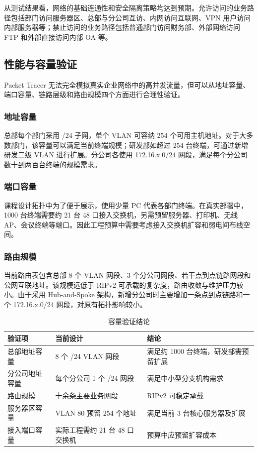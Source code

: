 \documentclass[12pt,a4paper]{ctexart}
\begin{document}
从测试结果看，网络的基础连通性和安全隔离策略均达到预期。允许访问的业务路径包括部门访问服务器区、总部与分公司互访、内网访问互联网、VPN 用户访问内部服务器等；禁止访问的业务路径包括普通部门访问财务部、外部网络访问 FTP 和外部直接访问内部 OA 等。

\subsection{性能与容量验证}

Packet Tracer 无法完全模拟真实企业网络中的高并发流量，但可以从地址容量、端口容量、链路层级和路由规模四个方面进行合理性验证。

\subsubsection{地址容量}

总部每个部门采用 /24 子网，单个 VLAN 可容纳 254 个可用主机地址。对于大多数部门，该容量可以满足当前终端规模；研发部如超过 254 台终端，可通过新增研发二级 VLAN 进行扩展。分公司各使用 172.16.x.0/24 网段，满足每个分公司数十到两百台终端的规模需求。

\subsubsection{端口容量}

课程设计拓扑中为了便于展示，使用少量 PC 代表各部门终端。在真实部署中，1000 台终端需要约 21 台 48 口接入交换机，另需预留服务器、打印机、无线 AP、会议终端等端口。因此工程预算中需要考虑接入交换机扩容和弱电间布线空间。

\subsubsection{路由规模}

当前路由表包含总部 8 个 VLAN 网段、3 个分公司网段、若干点到点链路网段和公网互联地址。该规模远低于 RIPv2 可承载的复杂度，路由收敛与维护压力较小。由于采用 Hub-and-Spoke 架构，新增分公司时主要增加一条点到点链路和一个 172.16.x.0/24 网段，对原有拓扑影响较小。

\begin{table}[H]
\centering
\caption{容量验证结论}
\label{tab:capacity-verify}
\begin{tabular}{|p{3.5cm}|p{5cm}|p{5cm}|}
\hline
\textbf{验证项} & \textbf{当前设计} & \textbf{结论} \\ \hline
总部地址容量 & 8 个 /24 VLAN 网段 & 满足约 1000 台终端，研发部需预留扩展 \\ \hline
分公司地址容量 & 每个分公司 1 个 /24 网段 & 满足中小型分支机构需求 \\ \hline
路由规模 & 十余条主要业务网段 & RIPv2 可稳定承载 \\ \hline
服务器区容量 & VLAN 80 预留 254 个地址 & 满足当前 3 台核心服务器及扩展 \\ \hline
接入端口容量 & 实际工程需约 21 台 48 口交换机 & 预算中应预留扩容成本 \\ \hline
\end{tabular}
\end{table}
\end{document}
